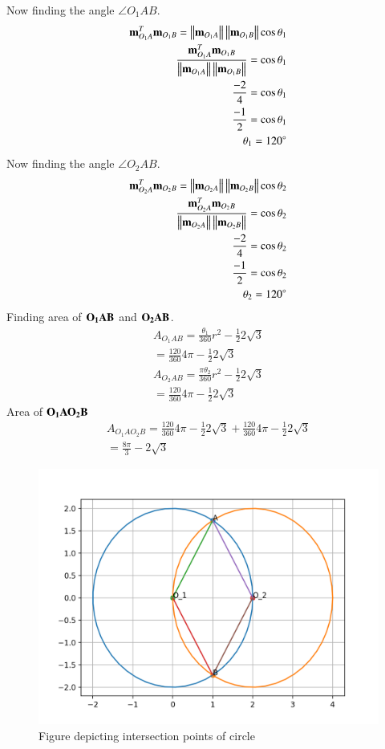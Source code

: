 \documentclass[journal,12pt,twocolumn]{IEEEtran}
\begin{document}
Now finding the angle $\angle{O_1AB}$.
\begin{align}
    \mathbf{m}_{O_1A}^T \mathbf{m}_{O_1B}=\left\lVert \mathbf{m}_{O_1A}\right\rVert\left\lVert\mathbf{m}_{O_1B}\right\rVert\cos\theta_1\\
    \frac{\mathbf{m}_{O_1A}^T \mathbf{m}_{O_1B}}{\left\lVert \mathbf{m}_{O_1A}\right\rVert\left\lVert\mathbf{m}_{O_1B}\right\rVert}
    =\cos\theta_1\\
     \frac{-2}{4}=\cos\theta_1\\
    \frac{-1}{2}=\cos\theta_1\\
    \theta_1=120^{\circ}
\end{align}
Now finding the angle $\angle{O_2AB}$.
\begin{align}
   \mathbf{m}_{O_2A}^T \mathbf{m}_{O_2B}=\left\lVert \mathbf{m}_{O_2A}\right\rVert\left\lVert\mathbf{m}_{O_2B}\right\rVert\cos\theta_2\\
    \frac{\mathbf{m}_{O_2A}^T \mathbf{m}_{O_2B}}{\left\lVert \mathbf{m}_{O_2A}\right\rVert\left\lVert\mathbf{m}_{O_2B}\right\rVert}
    =\cos\theta_2\\
     \frac{-2}{4}=\cos\theta_2\\
    \frac{-1}{2}=\cos\theta_2\\
    \theta_2=120^{\circ}
\end{align}
Finding area of $\bf{O_1AB}$ and $\bf{O_2AB}$.
 \begin{align}
A_{O_1AB}=\frac{\theta_1}{360}r^2-\frac{1}{2}2\sqrt{3}\\
=\frac{120}{360}4\pi-\frac{1}{2}2\sqrt{3}\\
A_{O_2AB}=\frac{\pi\theta_2}{360}r^2-\frac{1}{2}2\sqrt{3}\\
=\frac{120}{360}4\pi-\frac{1}{2}2\sqrt{3}
\end{align}
Area of  $\bf{O_1AO_2B}$
\begin{align}
A_{O_1AO_2B}=\frac{120}{360}4\pi-\frac{1}{2}2\sqrt{3}+\frac{120}{360}4\pi-\frac{1}{2}2\sqrt{3}\\
=\frac{8\pi}{3}-2\sqrt{3}
\end{align}
  \begin{figure}[h!]
	\centering
	\includegraphics[width=\columnwidth]{Assignment_5.png}
	\caption{Figure depicting intersection points of circle}
	\label{myfig}
\end{figure}
 
 
\end{document}
